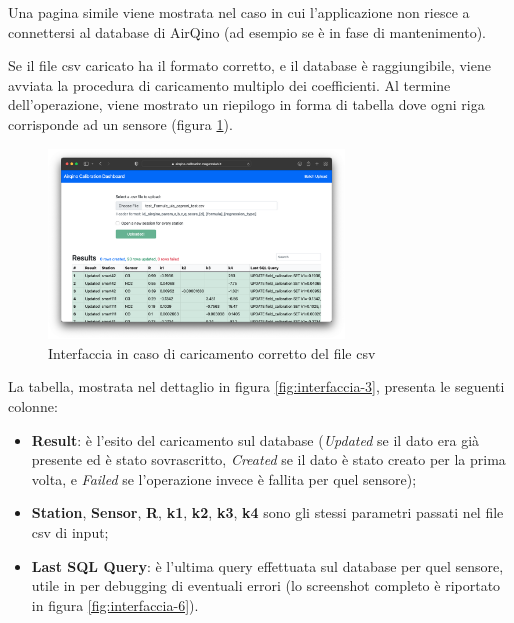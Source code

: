 Una pagina simile viene mostrata nel caso in cui l'applicazione non riesce a connettersi al database di AirQino (ad esempio se è in fase di mantenimento).

Se il file csv caricato ha il formato corretto, e il database è raggiungibile, viene avviata la procedura di caricamento multiplo dei coefficienti. Al termine dell'operazione, viene mostrato un riepilogo in forma di tabella dove ogni riga corrisponde ad un sensore (figura \ref{fig:interfaccia-2}).

\begin{figure}[H]
\centering
\includegraphics[width=0.70\textwidth,height=\textheight,keepaspectratio]{img/interfaccia_2}
\caption{Interfaccia in caso di caricamento corretto del file csv}
\label{fig:interfaccia-2}
\end{figure}

La tabella, mostrata nel dettaglio in figura \ref{fig:interfaccia-3}, presenta le seguenti colonne:
\begin{itemize}
  \item \textbf{Result}: è l'esito del caricamento sul database (\textit{Updated} se il dato era già presente ed è stato sovrascritto, \textit{Created} se il dato è stato creato per la prima volta, e \textit{Failed} se l'operazione invece è fallita per quel sensore);
  \item \textbf{Station}, \textbf{Sensor}, \textbf{R}, \textbf{k1}, \textbf{k2}, \textbf{k3}, \textbf{k4} sono gli stessi parametri passati nel file csv di input;
  \item \textbf{Last SQL Query}: è l'ultima query effettuata sul database per quel sensore, utile in per debugging di eventuali errori (lo screenshot completo è riportato in figura \ref{fig:interfaccia-6}).
\end{itemize}

